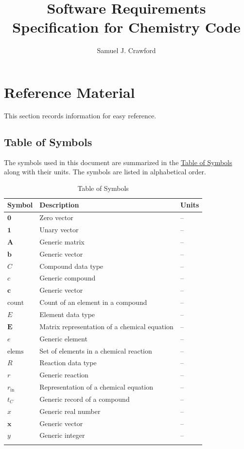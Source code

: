 \documentclass[12pt]{article}
\title{Software Requirements Specification for Chemistry Code}
\author{Samuel J. Crawford}
\begin{document}
\maketitle
\tableofcontents
\newpage
\section{Reference Material}
\label{Sec:RefMat}
This section records information for easy reference.

\subsection{Table of Symbols}
\label{Sec:ToS}
The symbols used in this document are summarized in the \hyperref[Table:ToS]{Table of Symbols} along with their units. The symbols are listed in alphabetical order.

\begin{longtable}{l l l}
\toprule
\textbf{Symbol} & \textbf{Description} & \textbf{Units}
\\
\midrule
\endhead
$\symbf{0}$ & Zero vector & --
\\
$\symbf{1}$ & Unary vector & --
\\
$\symbf{A}$ & Generic matrix & --
\\
$\symbf{b}$ & Generic vector & --
\\
$C$ & Compound data type & --
\\
$c$ & Generic compound & --
\\
$\symbf{c}$ & Generic vector & --
\\
$\text{count}$ & Count of an element in a compound & --
\\
$E$ & Element data type & --
\\
$\symbf{E}$ & Matrix representation of a chemical equation & --
\\
$e$ & Generic element & --
\\
$\text{elems}$ & Set of elements in a chemical reaction & --
\\
$R$ & Reaction data type & --
\\
$r$ & Generic reaction & --
\\
${r_{\text{in}}}$ & Representation of a chemical equation & --
\\
${t_{C}}$ & Generic record of a compound & --
\\
$x$ & Generic real number & --
\\
$\symbf{x}$ & Generic vector & --
\\
$y$ & Generic integer & --
\\
\bottomrule
\caption{Table of Symbols}
\label{Table:ToS}
\end{longtable}
\end{document}
